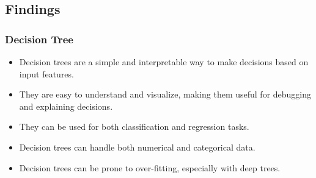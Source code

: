 \subsection*{Findings}

\subsubsection{Decision Tree}
\begin{itemize}
    \item Decision trees are a simple and interpretable way to make decisions based on input features.
    \item They are easy to understand and visualize, making them useful for debugging and explaining decisions.
    \item They can be used for both classification and regression tasks.
    \item Decision trees can handle both numerical and categorical data.
    \item Decision trees can be prone to over-fitting, especially with deep trees.
\end{itemize}

